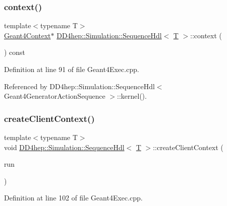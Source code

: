 \subsubsection{\texorpdfstring{context()}{context()}}
{\footnotesize\ttfamily template$<$typename T$>$ \\
\hyperlink{class_d_d4hep_1_1_simulation_1_1_geant4_context}{Geant4\+Context}$\ast$ \hyperlink{class_d_d4hep_1_1_simulation_1_1_sequence_hdl}{D\+D4hep\+::\+Simulation\+::\+Sequence\+Hdl}$<$ \hyperlink{class_t}{T} $>$\+::context (\begin{DoxyParamCaption}{ }\end{DoxyParamCaption}) const\hspace{0.3cm}{\ttfamily [inline]}}



Definition at line 91 of file Geant4\+Exec.\+cpp.



Referenced by D\+D4hep\+::\+Simulation\+::\+Sequence\+Hdl$<$ Geant4\+Generator\+Action\+Sequence $>$\+::kernel().

\hypertarget{class_d_d4hep_1_1_simulation_1_1_sequence_hdl_a6f817d21c75a96ad450c35fd4748d762}{}\label{class_d_d4hep_1_1_simulation_1_1_sequence_hdl_a6f817d21c75a96ad450c35fd4748d762} 
\subsubsection{\texorpdfstring{create\+Client\+Context()}{createClientContext()}\hspace{0.1cm}{\footnotesize\ttfamily [1/2]}}
{\footnotesize\ttfamily template$<$typename T$>$ \\
void \hyperlink{class_d_d4hep_1_1_simulation_1_1_sequence_hdl}{D\+D4hep\+::\+Simulation\+::\+Sequence\+Hdl}$<$ \hyperlink{class_t}{T} $>$\+::create\+Client\+Context (\begin{DoxyParamCaption}\item[{const G4\+Run $\ast$}]{run }\end{DoxyParamCaption})\hspace{0.3cm}{\ttfamily [inline]}}



Definition at line 102 of file Geant4\+Exec.\+cpp.



